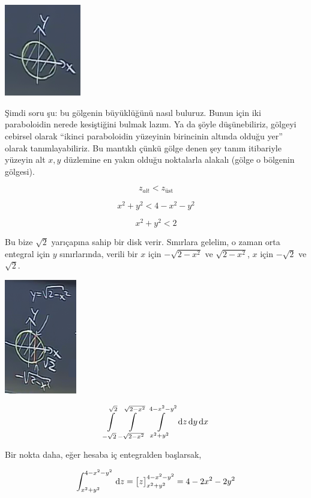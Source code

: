 \documentclass[12pt,fleqn]{article}\usepackage{../../common}
\begin{document}
\begin{center}
\includegraphics[height=4cm]{25_6.png}
\end{center}

Şimdi soru şu: bu gölgenin büyüklüğünü nasıl buluruz. Bunun için iki
paraboloidin nerede kesiştiğini bulmak lazım. Ya da şöyle düşünebiliriz,
gölgeyi cebirsel olarak ``ikinci paraboloidin yüzeyinin birincinin altında
olduğu yer'' olarak tanımlayabiliriz. Bu mantıklı çünkü gölge denen şey
tanım itibariyle yüzeyin alt $x,y$ düzlemine en yakın olduğu noktalarla
alakalı (gölge o bölgenin gölgesi).

$$ z_{alt} < z_{\textrm{üst}} $$

$$ x^2 + y^2 < 4 - x^2 -y^2 $$

$$ x^2 + y^2 < 2 $$

Bu bize $\sqrt{2}$ yarıçapına sahip bir disk verir. Sınırlara gelelim, o
zaman orta entegral için $y$ sınırlarında, verili bir $x$ için
$-\sqrt{2-x^2}$ ve $\sqrt{2-x^2}$, $x$ için $-\sqrt{2}$ ve $\sqrt{2}$.

\begin{center}
\includegraphics[height=5cm]{25_7.png}
\end{center}

$$ 
\int\limits_{-\sqrt{2}}^{\sqrt{2}}
\int\limits_{-\sqrt{2-x^2}}^{\sqrt{2-x^2}} 
\int\limits_{x^2+y^2}^{4-x^2-y^2} 
\,\mathrm{d} z \,\mathrm{d} y \,\mathrm{d} x
$$

Bir nokta daha, eğer hesaba iç entegralden başlarsak, 

$$ 
\int_{x^2+y^2}^{4-x^2-y^2} \,\mathrm{d} z = 
\big[ z \big]_{x^2+y^2}^{4-x^2-y^2} = 
4-2x^2-2y^2
$$
\end{document}
